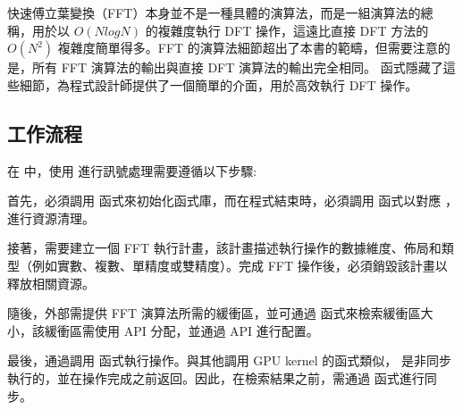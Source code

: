 快速傅立葉變換（FFT）本身並不是一種具體的演算法，而是一組演算法的總稱，用於以 $O(NlogN)$ 的複雜度執行 DFT 操作，這遠比直接 DFT 方法的 $O(N^2)$ 複雜度簡單得多。FFT 的演算法細節超出了本書的範疇，但需要注意的是，所有 FFT 演算法的輸出與直接 DFT 演算法的輸出完全相同。 函式隱藏了這些細節，為程式設計師提供了一個簡單的介面，用於高效執行 DFT 操作。

\subsection{ 工作流程}
在  中，使用  進行訊號處理需要遵循以下步驟:

首先，必須調用  函式來初始化函式庫，而在程式結束時，必須調用  函式以對應 ，進行資源清理。

接著，需要建立一個 FFT 執行計畫，該計畫描述執行操作的數據維度、佈局和類型（例如實數、複數、單精度或雙精度）。完成 FFT 操作後，必須銷毀該計畫以釋放相關資源。

隨後，外部需提供 FFT 演算法所需的緩衝區，並可通過  函式來檢索緩衝區大小，該緩衝區需使用  API 分配，並通過  API 進行配置。

最後，通過調用  函式執行操作。與其他調用 GPU kernel 的函式類似， 是非同步執行的，並在操作完成之前返回。因此，在檢索結果之前，需通過  函式進行同步。

